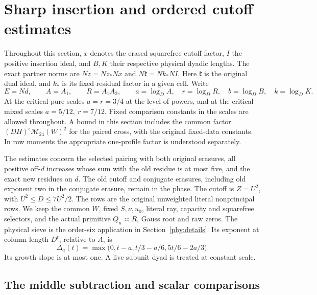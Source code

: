 \section{Sharp insertion and ordered cutoff estimates}
\label{pca:details}

Throughout this section, \(x\) denotes the erased squarefree cutoff
factor, \(I\) the positive insertion ideal, and \(B,K\) their respective
physical dyadic lengths. The exact partner norms are \(Nz=Nz_*Nx\) and
\(N\mathfrak k=Nk_*NI\). Here \(\mathfrak k\) is the original dual ideal,
and \(k_*\) is its fixed residual factor in a given cell. Write
\[
 E=Nd,\qquad A=A_1,\qquad R=A_1A_2,\qquad
 a=\log_D A,\quad r=\log_D R,\quad b=\log_D B,\quad k=\log_D K .
\]
At the critical pure scales \(a=r=3/4\) at the level of powers, and
at the critical mixed scales \(a=5/12,\ r=7/12\). Fixed comparison
constants in the scales are allowed throughout. A bound in this
section includes the common factor
\((DH)^\epsilon\mathcal M_{24}(W)^2\) for the paired cross, with the
original fixed-data constants. In row moments the appropriate one-profile
factor is understood separately.

The estimates concern the selected pairing with both original erasures,
all positive off-\(d\) increases whose sum with the old residue is at
most five, and the exact new residues on \(d\). The old cutoff and
conjugate erasures, including old exponent two in the conjugate
erasure, remain in the phase. The cutoff is \(Z=U^2\), with
\(U^2\le D\le7U^2/2\). The rows are the original unweighted literal
nonprincipal rows. We keep the common \(W\), fixed \(S,\nu,u_0\),
literal ray, capacity and squarefree selectors, and the actual
primitive \(Q_u\asymp R\), Gauss root and raw zeros. The physical
sieve is the order-six application in Section~\ref{phy:details}.
Its exponent at column length \(D^t\), relative to \(A\), is
\begin{equation}\label{pca:detail-delta}
 \Delta_a(t)=\max\bigl(0,t-a,t/3-a/6,5t/6-2a/3\bigr).
\end{equation}
Its growth slope is at most one. A live subunit dyad is treated
at constant scale.

\subsection{The middle subtraction and scalar comparisons}
\label{pca:detail-radial}

